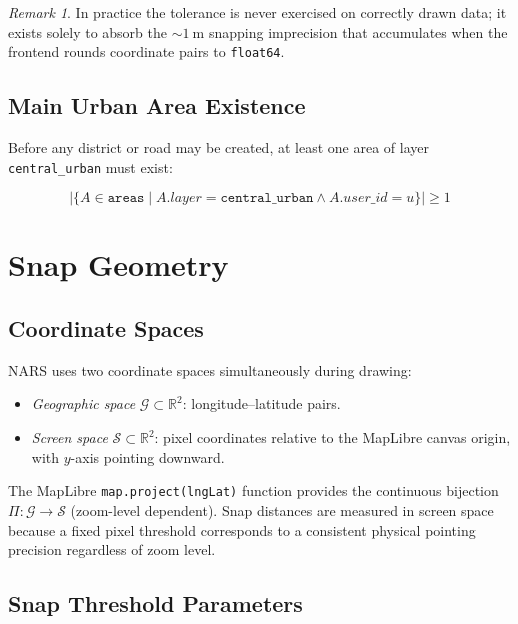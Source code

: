 \documentclass[12pt,a4paper]{article}
\theoremstyle{definition}
\theoremstyle{plain}
\theoremstyle{remark}
\newtheorem{remark}{Remark}[section]
\newcommand{\R}{\mathbb{R}}
\newcommand{\abs}[1]{\left\lvert #1 \right\rvert}
\begin{document}
\begin{remark}
In practice the tolerance is never exercised on correctly drawn data; it
exists solely to absorb the ${\sim}1\ \mathrm{m}$ snapping imprecision
that accumulates when the frontend rounds coordinate pairs to \texttt{float64}.
\end{remark}

\subsection{Main Urban Area Existence}
\label{sec:urban_exists}

Before any district or road may be created, at least one area of layer
\texttt{central\_urban} must exist:

\begin{equation}
  \abs{\{
    A \in \texttt{areas} \mid
    A.\mathit{layer} = \texttt{central\_urban} \land
    A.\mathit{user\_id} = u
  \}} \geq 1
  \label{eq:urban_exists}
\end{equation}

\section{Snap Geometry}
\label{sec:snap}

\subsection{Coordinate Spaces}

NARS uses two coordinate spaces simultaneously during drawing:

\begin{itemize}
  \item \emph{Geographic space} $\mathcal{G} \subset \R^2$: longitude--latitude pairs.
  \item \emph{Screen space} $\mathcal{S} \subset \R^2$: pixel coordinates relative
    to the MapLibre canvas origin, with $y$-axis pointing downward.
\end{itemize}

The MapLibre \texttt{map.project(lngLat)} function provides the continuous
bijection $\Pi: \mathcal{G} \to \mathcal{S}$ (zoom-level dependent). Snap
distances are measured in screen space because a fixed pixel threshold
corresponds to a consistent physical pointing precision regardless of
zoom level.

\subsection{Snap Threshold Parameters}
\end{document}
